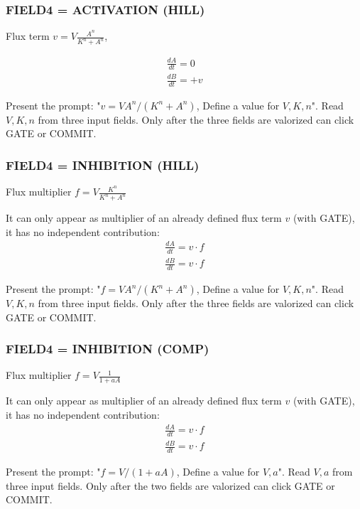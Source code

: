 \documentclass[11pt, oneside]{article}
\begin{document}
\subsubsection{FIELD4 = ACTIVATION (HILL)}

Flux term $v = V \tfrac{ A^n }{ K^n + A^n}$,

\begin{align}
\frac{dA}{dt} = 0 \\
\frac{dB}{dt} = +v
\end{align}

Present the prompt: "$v = V A^n/(K^n+A^n)$, Define a value for $V,K,n$". Read $V,K,n$ from three input fields.
Only after the three fields are valorized can click GATE or COMMIT.


\subsubsection{FIELD4 = INHIBITION (HILL)}

Flux multiplier $f = V \tfrac{ K^n }{ K^n + A^n}$

It can only appear as multiplier of an already defined flux term $v$ (with GATE), it has no independent contribution:
\begin{align}
\frac{dA}{dt} = v \cdot f \\
\frac{dB}{dt} = v \cdot f
\end{align}

Present the prompt: "$f = V A^n/(K^n+A^n)$, Define a value for $V,K,n$". Read $V,K,n$ from three input fields.
Only after the three fields are valorized can click GATE or COMMIT.


\subsubsection{FIELD4 = INHIBITION (COMP)}

Flux multiplier $f = V \tfrac{ 1 }{ 1 + aA}$

It can only appear as multiplier of an already defined flux term $v$ (with GATE), it has no independent contribution:
\begin{align}
\frac{dA}{dt} = v \cdot f \\
\frac{dB}{dt} = v \cdot f
\end{align}

Present the prompt: "$f = V/(1+aA)$, Define a value for $V,a$". Read $V,a$ from three input fields.
Only after the two fields are valorized can click GATE or COMMIT.
\end{document}
